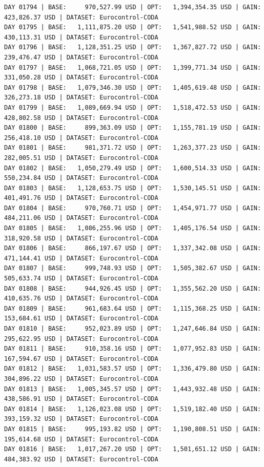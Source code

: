 \documentclass[11pt,a4paper]{article}
\begin{document}
\begin{verbatim}
DAY 01794 | BASE:     970,527.99 USD | OPT:   1,394,354.35 USD | GAIN: 423,826.37 USD | DATASET: Eurocontrol-CODA
DAY 01795 | BASE:   1,111,875.20 USD | OPT:   1,541,988.52 USD | GAIN: 430,113.31 USD | DATASET: Eurocontrol-CODA
DAY 01796 | BASE:   1,128,351.25 USD | OPT:   1,367,827.72 USD | GAIN: 239,476.47 USD | DATASET: Eurocontrol-CODA
DAY 01797 | BASE:   1,068,721.05 USD | OPT:   1,399,771.34 USD | GAIN: 331,050.28 USD | DATASET: Eurocontrol-CODA
DAY 01798 | BASE:   1,079,346.30 USD | OPT:   1,405,619.48 USD | GAIN: 326,273.18 USD | DATASET: Eurocontrol-CODA
DAY 01799 | BASE:   1,089,669.94 USD | OPT:   1,518,472.53 USD | GAIN: 428,802.58 USD | DATASET: Eurocontrol-CODA
DAY 01800 | BASE:     899,363.09 USD | OPT:   1,155,781.19 USD | GAIN: 256,418.10 USD | DATASET: Eurocontrol-CODA
DAY 01801 | BASE:     981,371.72 USD | OPT:   1,263,377.23 USD | GAIN: 282,005.51 USD | DATASET: Eurocontrol-CODA
DAY 01802 | BASE:   1,050,279.49 USD | OPT:   1,600,514.33 USD | GAIN: 550,234.84 USD | DATASET: Eurocontrol-CODA
DAY 01803 | BASE:   1,128,653.75 USD | OPT:   1,530,145.51 USD | GAIN: 401,491.76 USD | DATASET: Eurocontrol-CODA
DAY 01804 | BASE:     970,760.71 USD | OPT:   1,454,971.77 USD | GAIN: 484,211.06 USD | DATASET: Eurocontrol-CODA
DAY 01805 | BASE:   1,086,255.96 USD | OPT:   1,405,176.54 USD | GAIN: 318,920.58 USD | DATASET: Eurocontrol-CODA
DAY 01806 | BASE:     866,197.67 USD | OPT:   1,337,342.08 USD | GAIN: 471,144.41 USD | DATASET: Eurocontrol-CODA
DAY 01807 | BASE:     999,748.93 USD | OPT:   1,505,382.67 USD | GAIN: 505,633.74 USD | DATASET: Eurocontrol-CODA
DAY 01808 | BASE:     944,926.45 USD | OPT:   1,355,562.20 USD | GAIN: 410,635.76 USD | DATASET: Eurocontrol-CODA
DAY 01809 | BASE:     961,683.64 USD | OPT:   1,115,368.25 USD | GAIN: 153,684.61 USD | DATASET: Eurocontrol-CODA
DAY 01810 | BASE:     952,023.89 USD | OPT:   1,247,646.84 USD | GAIN: 295,622.95 USD | DATASET: Eurocontrol-CODA
DAY 01811 | BASE:     910,358.16 USD | OPT:   1,077,952.83 USD | GAIN: 167,594.67 USD | DATASET: Eurocontrol-CODA
DAY 01812 | BASE:   1,031,583.57 USD | OPT:   1,336,479.80 USD | GAIN: 304,896.22 USD | DATASET: Eurocontrol-CODA
DAY 01813 | BASE:   1,005,345.57 USD | OPT:   1,443,932.48 USD | GAIN: 438,586.91 USD | DATASET: Eurocontrol-CODA
DAY 01814 | BASE:   1,126,023.08 USD | OPT:   1,519,182.40 USD | GAIN: 393,159.32 USD | DATASET: Eurocontrol-CODA
DAY 01815 | BASE:     995,193.82 USD | OPT:   1,190,808.51 USD | GAIN: 195,614.68 USD | DATASET: Eurocontrol-CODA
DAY 01816 | BASE:   1,017,267.20 USD | OPT:   1,501,651.12 USD | GAIN: 484,383.92 USD | DATASET: Eurocontrol-CODA

\end{verbatim}
\end{document}
